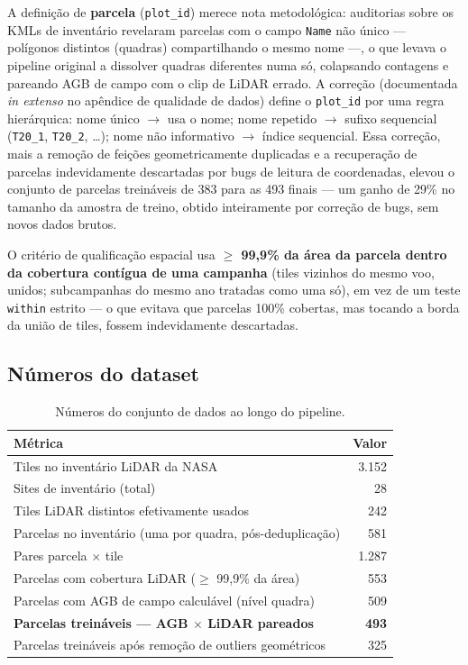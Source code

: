 A definição de \textbf{parcela} (\texttt{plot\_id}) merece nota metodológica:
auditorias sobre os KMLs de inventário revelaram parcelas com o campo
\texttt{Name} não único --- polígonos distintos (quadras) compartilhando o mesmo
nome ---, o que levava o pipeline original a dissolver quadras diferentes numa só,
colapsando contagens e pareando AGB de campo com o clip de LiDAR errado. A
correção (documentada \textit{in extenso} no apêndice de qualidade de dados)
define o \texttt{plot\_id} por uma regra hierárquica: nome único $\rightarrow$ usa
o nome; nome repetido $\rightarrow$ sufixo sequencial (\texttt{T20\_1},
\texttt{T20\_2}, \dots); nome não informativo $\rightarrow$ índice sequencial.
Essa correção, mais a remoção de feições geometricamente duplicadas e a
recuperação de parcelas indevidamente descartadas por bugs de leitura de
coordenadas, elevou o conjunto de parcelas treináveis de 383 para as 493 finais
--- um ganho de 29\% no tamanho da amostra de treino, obtido inteiramente por
correção de bugs, sem novos dados brutos.

O critério de qualificação espacial usa \textbf{$\geq$ 99,9\% da área da parcela
dentro da cobertura contígua de uma campanha} (tiles vizinhos do mesmo voo,
unidos; subcampanhas do mesmo ano tratadas como uma só), em vez de um teste
\texttt{within} estrito --- o que evitava que parcelas 100\% cobertas, mas tocando
a borda da união de tiles, fossem indevidamente descartadas.

\subsection{Números do dataset}

\begin{table}[H]
  \centering
  \caption{Números do conjunto de dados ao longo do pipeline.}
  \label{tab:dataset}
  \begin{tabular}{lr}
    \toprule
    \textbf{Métrica} & \textbf{Valor} \\
    \midrule
    Tiles no inventário LiDAR da NASA & 3.152 \\
    Sites de inventário (total) & 28 \\
    Tiles LiDAR distintos efetivamente usados & 242 \\
    Parcelas no inventário (uma por quadra, pós-deduplicação) & 581 \\
    Pares parcela $\times$ tile & 1.287 \\
    Parcelas com cobertura LiDAR ($\geq$ 99,9\% da área) & 553 \\
    Parcelas com AGB de campo calculável (nível quadra) & 509 \\
    \textbf{Parcelas treináveis --- AGB $\times$ LiDAR pareados} & \textbf{493} \\
    Parcelas treináveis após remoção de outliers geométricos & 325 \\
    \bottomrule
  \end{tabular}
\end{table}


